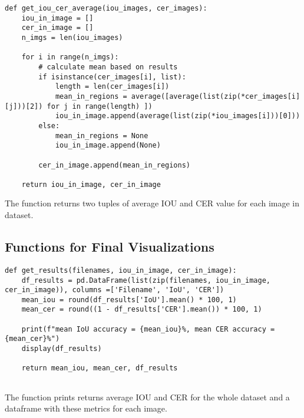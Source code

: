 \begin{lstlisting}[caption=get\_iou\_cer\_average]
def get_iou_cer_average(iou_images, cer_images):
    iou_in_image = []
    cer_in_image = []
    n_imgs = len(iou_images)
    
    for i in range(n_imgs):
        # calculate mean based on results 
        if isinstance(cer_images[i], list):
            length = len(cer_images[i])
            mean_in_regions = average([average(list(zip(*cer_images[i][j]))[2]) for j in range(length) ])
            iou_in_image.append(average(list(zip(*iou_images[i]))[0]))
        else:
            mean_in_regions = None
            iou_in_image.append(None)

        cer_in_image.append(mean_in_regions)
        
    return iou_in_image, cer_in_image
\end{lstlisting}
   
The function  returns two tuples of average IOU and CER value for each image in dataset.


\subsection*{Functions for Final Visualizations}

\begin{lstlisting}[caption=get\_results]
def get_results(filenames, iou_in_image, cer_in_image):
    df_results = pd.DataFrame(list(zip(filenames, iou_in_image, cer_in_image)), columns =['Filename', 'IoU', 'CER'])
    mean_iou = round(df_results['IoU'].mean() * 100, 1)
    mean_cer = round((1 - df_results['CER'].mean()) * 100, 1)
    
    print(f"mean IoU accuracy = {mean_iou}%, mean CER accuracy = {mean_cer}%")
    display(df_results)
    
    return mean_iou, mean_cer, df_results
    
\end{lstlisting}

The function  prints returns average IOU and CER for the whole dataset and a dataframe with these metrics for each image.



